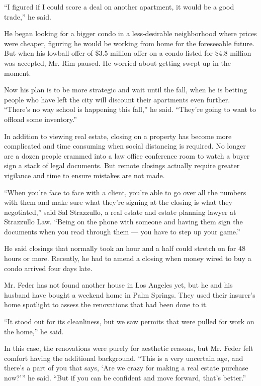 ``I figured if I could score a deal on another apartment, it would be a
good trade,'' he said.

He began looking for a bigger condo in a less-desirable neighborhood
where prices were cheaper, figuring he would be working from home for
the foreseeable future. But when his lowball offer of \$3.5 million
offer on a condo listed for \$4.8 million was accepted, Mr. Rim paused.
He worried about getting swept up in the moment.

Now his plan is to be more strategic and wait until the fall, when he is
betting people who have left the city will discount their apartments
even further. ``There's no way school is happening this fall,'' he said.
``They're going to want to offload some inventory.''

In addition to viewing real estate, closing on a property has become
more complicated and time consuming when social distancing is required.
No longer are a dozen people crammed into a law office conference room
to watch a buyer sign a stack of legal documents. But remote closings
actually require greater vigilance and time to ensure mistakes are not
made.

``When you're face to face with a client, you're able to go over all the
numbers with them and make sure what they're signing at the closing is
what they negotiated,'' said Sal Strazzullo, a real estate and estate
planning lawyer at Strazzullo Law. ``Being on the phone with someone and
having them sign the documents when you read through them --- you have
to step up your game.''

He said closings that normally took an hour and a half could stretch on
for 48 hours or more. Recently, he had to amend a closing when money
wired to buy a condo arrived four days late.

Mr. Feder has not found another house in Los Angeles yet, but he and his
husband have bought a weekend home in Palm Springs. They used their
insurer's home spotlight to assess the renovations that had been done to
it.

``It stood out for its cleanliness, but we saw permits that were pulled
for work on the home,'' he said.

In this case, the renovations were purely for aesthetic reasons, but Mr.
Feder felt comfort having the additional background. ``This is a very
uncertain age, and there's a part of you that says, `Are we crazy for
making a real estate purchase now?''' he said. ``But if you can be
confident and move forward, that's better.''

